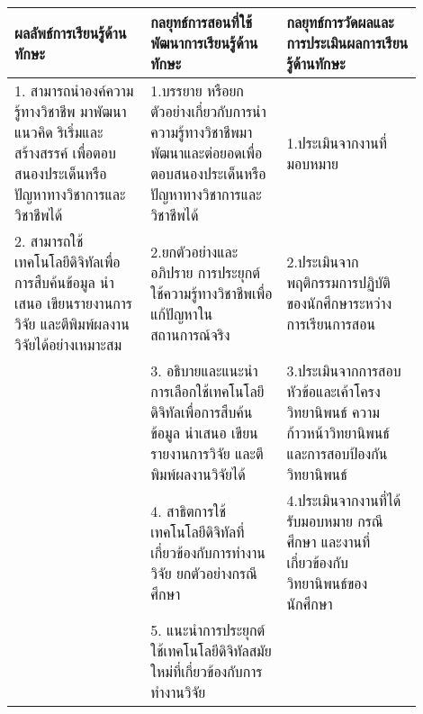 \begin{landscape}
 \par\noindent\bigskip
 \renewcommand{\arraystretch}{1.3}
 \begin{tabular}{|p{0.3\linewidth}|p{0.3\linewidth}|p{0.3\linewidth}|}
\hline
\textbf{ผลลัพธ์การเรียนรู้ด้านทักษะ} & \textbf{กลยุทธ์การสอนที่ใช้พัฒนาการเรียนรู้ด้านทักษะ} & \textbf{กลยุทธ์การวัดผลและการประเมินผลการเรียนรู้ด้านทักษะ} \\
\hline 
1. สามารถนำองค์ความรู้ทางวิชาชีพ มาพัฒนาแนวคิด ริเริ่มและสร้างสรรค์ เพื่อตอบสนองประเด็นหรือปัญหาทางวิชาการและวิชาชีพได้ & 1.บรรยาย หรือยกตัวอย่างเกี่ยวกับการนำความรู้ทางวิชาชีพมาพัฒนาและต่อยอดเพื่อตอบสนองประเด็นหรือปัญหาทางวิชาการและวิชาชีพได้ & 1.ประเมินจากงานที่มอบหมาย \\ \hline
2. สามารถใช้เทคโนโลยีดิจิทัลเพื่อการสืบค้นข้อมูล นำเสนอ เขียนรายงานการวิจัย และตีพิมพ์ผลงานวิจัยได้อย่างเหมาะสม & 2.ยกตัวอย่างและอภิปราย การประยุกต์ใช้ความรู้ทางวิชาชีพเพื่อแก้ปัญหาในสถานการณ์จริง & 2.ประเมินจากพฤติกรรมการปฏิบัติของนักศึกษาระหว่างการเรียนการสอน \\ \hline
 & 3. อธิบายและแนะนำการเลือกใช้เทคโนโลยีดิจิทัลเพื่อการสืบค้นข้อมูล นำเสนอ เขียนรายงานการวิจัย และตีพิมพ์ผลงานวิจัยได้ & 3.ประเมินจากการสอบหัวข้อและเค้าโครงวิทยานิพนธ์ ความก้าวหน้าวิทยานิพนธ์ และการสอบป้องกันวิทยานิพนธ์ \\ \hline
 & 4. สาธิตการใช้เทคโนโลยีดิจิทัลที่เกี่ยวข้องกับการทำงานวิจัย ยกตัวอย่างกรณีศึกษา & 4.ประเมินจากงานที่ได้รับมอบหมาย กรณีศึกษา และงานที่เกี่ยวข้องกับวิทยานิพนธ์ของนักศึกษา \\ \hline
 & 5. แนะนำการประยุกต์ใช้เทคโนโลยีดิจิทัลสมัยใหม่ที่เกี่ยวข้องกับการทำงานวิจัย &  \\ \hline
 \end{tabular}
 

\end{landscape}
